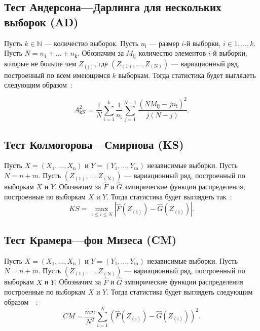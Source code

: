 \documentclass[12pt]{article}
\theoremstyle{break}
\begin{document}
\newpage
 
\subsection{Тест Андерсона---Дарлинга для нескольких выборок (AD)}

Пусть $k \in \mathbb{N}$ --- количество выборок. Пусть $n_{\mathrm{i}}$ --- размер $i$-й выборки, $ i \in 1, \ldots, k$. \\ Пусть $N = n_1 + \ldots + n_{\mathrm{k}}$. Обозначим за $M_{\mathrm{ij}}$ количество 
элементов $i$-й выборки, которые не больше чем $Z_{(\mathrm{j})}$, где $(Z_{(1)}, \ldots, Z_{(\mathrm{N})})$ --- вариационный ряд, построенный по всем имеющимся $k$ выборкам. Тогда статистика будет выглядеть следующим образом~\cite{AD_article}:

\begin{equation*}
	A_{\mathrm{kN}}^2 = \frac{1}{N} \sum_{i=1}^k \frac{1}{n_{\mathrm{i}}} \sum_{j=1}^{N-1} \frac{(NM_{\mathrm{ij}}-jn_{\mathrm{i}})^2}{j(N-j)}.
\end{equation*}



\subsection{Тест Колмогорова---Смирнова (KS)}
Пусть $X = (X_1, \ldots,X_{\mathrm{n}})$ и $Y = (Y_1, \ldots, Y_{\mathrm{m}})$ независимые выборки. Пусть $N = n + m$.
Пусть $(Z_{(1)}, \ldots, Z_{(\mathrm{N})})$ --- вариационный ряд, построенный по выборкам $X$ и $Y$. Обозначим за $\hat{F}$ и $\hat{G}$ эмпирические функции распределения, построенные по выборкам $X$ и $Y$. Тогда статистика будет выглядеть так~\cite{KS_CM_article}:
\begin{equation*}
	KS = \max_{1\leq i \leq N} | \hat{F}(Z_{(\mathrm{i})}) - \hat{G}(Z_{(\mathrm{i})})  |.
\end{equation*}



\subsection{Тест Крамера---фон Мизеса (CM)}
Пусть $X = (X_1, \ldots,X_{\mathrm{n}})$ и $Y = (Y_1, \ldots, Y_{\mathrm{m}})$ независимые выборки. Пусть $N = n + m$.
Пусть $(Z_{(1)}, \ldots, Z_{(\mathrm{N})})$ --- вариационный ряд, построенный по выборкам $X$ и $Y$. Обозначим за $\hat{F}$ и $\hat{G}$ эмпирические функции распределения построенные по выборкам $X$ и $Y$. Тогда статистика будет выглядеть следующим образом~~\cite{KS_CM_article}:
\begin{equation*}
	CM = \frac{mn}{N^2} \sum_{i=1}^{N} (\hat{F}(Z_{(\mathrm{i})}) - \hat{G}(Z_{(\mathrm{i})}))^2.
\end{equation*}
\end{document}
